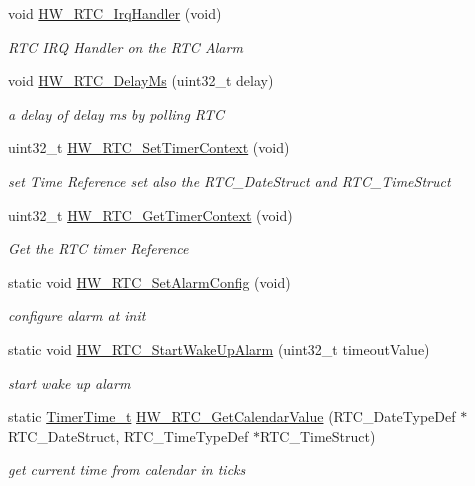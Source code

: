 \begin{DoxyCompactItemize}
void \mbox{\hyperlink{group___lory_s_d_k___r_t_c___functions_gae8ae8ef64d3025701112d509285006d4}{H\+W\+\_\+\+R\+T\+C\+\_\+\+Irq\+Handler}} (void)
\begin{DoxyCompactList}\small\item\em R\+TC I\+RQ Handler on the R\+TC Alarm \end{DoxyCompactList}\item 
void \mbox{\hyperlink{group___lory_s_d_k___r_t_c___functions_gadad8cbf36cbe8a65bc1c70109146e307}{H\+W\+\_\+\+R\+T\+C\+\_\+\+Delay\+Ms}} (uint32\+\_\+t delay)
\begin{DoxyCompactList}\small\item\em a delay of delay ms by polling R\+TC \end{DoxyCompactList}\item 
uint32\+\_\+t \mbox{\hyperlink{group___lory_s_d_k___r_t_c___functions_gad0a54228cfe8473d90b901ebd76de1d5}{H\+W\+\_\+\+R\+T\+C\+\_\+\+Set\+Timer\+Context}} (void)
\begin{DoxyCompactList}\small\item\em set Time Reference set also the R\+T\+C\+\_\+\+Date\+Struct and R\+T\+C\+\_\+\+Time\+Struct \end{DoxyCompactList}\item 
uint32\+\_\+t \mbox{\hyperlink{group___lory_s_d_k___r_t_c___functions_ga1d964c4efab63ea6a4b4ba8f3773e5b0}{H\+W\+\_\+\+R\+T\+C\+\_\+\+Get\+Timer\+Context}} (void)
\begin{DoxyCompactList}\small\item\em Get the R\+TC timer Reference \end{DoxyCompactList}\item 
static void \mbox{\hyperlink{group___lory_s_d_k___r_t_c___functions_ga38285b86b2811230b0a55416ce3c33c7}{H\+W\+\_\+\+R\+T\+C\+\_\+\+Set\+Alarm\+Config}} (void)
\begin{DoxyCompactList}\small\item\em configure alarm at init \end{DoxyCompactList}\item 
static void \mbox{\hyperlink{group___lory_s_d_k___r_t_c___functions_ga60703fcfc4abd73a2efc980e8bb6ad27}{H\+W\+\_\+\+R\+T\+C\+\_\+\+Start\+Wake\+Up\+Alarm}} (uint32\+\_\+t timeout\+Value)
\begin{DoxyCompactList}\small\item\em start wake up alarm \end{DoxyCompactList}\item 
static \mbox{\hyperlink{utilities_8h_a4215ca43d3e953099ea758ce428599d0}{Timer\+Time\+\_\+t}} \mbox{\hyperlink{group___lory_s_d_k___r_t_c___functions_gaf81b8dc866a5c7b125355b55e3953387}{H\+W\+\_\+\+R\+T\+C\+\_\+\+Get\+Calendar\+Value}} (R\+T\+C\+\_\+\+Date\+Type\+Def $\ast$R\+T\+C\+\_\+\+Date\+Struct, R\+T\+C\+\_\+\+Time\+Type\+Def $\ast$R\+T\+C\+\_\+\+Time\+Struct)
\begin{DoxyCompactList}\small\item\em get current time from calendar in ticks \end{DoxyCompactList}\end{DoxyCompactItemize}


